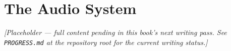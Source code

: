 \chapter{The Audio System}
\label{ch:audio-system}

\emph{[Placeholder --- full content pending in this book's next writing pass. See \texttt{PROGRESS.md} at the repository root for the current writing status.]}
